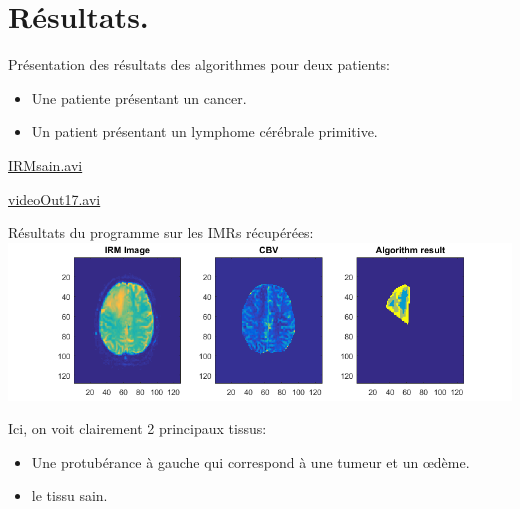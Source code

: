 \documentclass{beamer}
\begin{document}


\section{Résultats.}

\begin{frame}

Présentation des résultats des algorithmes pour deux patients:

\begin{itemize}
\item Une patiente présentant un cancer.
\item Un patient présentant un lymphome cérébrale primitive.
\end{itemize}

\url{IRMsain.avi}


\end{frame}

\begin{frame}

\url{videoOut17.avi}

\end{frame}

\begin{frame}

Résultats du programme sur les IMRs récupérées:
\includegraphics[scale=0.40]{Patient2Result.png}

Ici, on voit clairement 2 principaux tissus:
\begin{itemize}
\item Une protubérance à gauche qui correspond à une tumeur et un œdème.
\item le tissu sain.
\end{itemize}
\end{frame}
\end{document}
